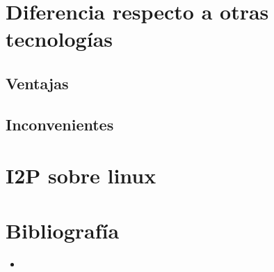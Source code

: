 \documentclass{article}
\begin{document}
\section{Diferencia respecto a otras tecnologías}
\subsection{Ventajas}
\subsection{Inconvenientes}
\section{I2P sobre linux}
\section{Bibliografía}
\begin{itemize}
    \item %
\end{itemize}
\end{document}
